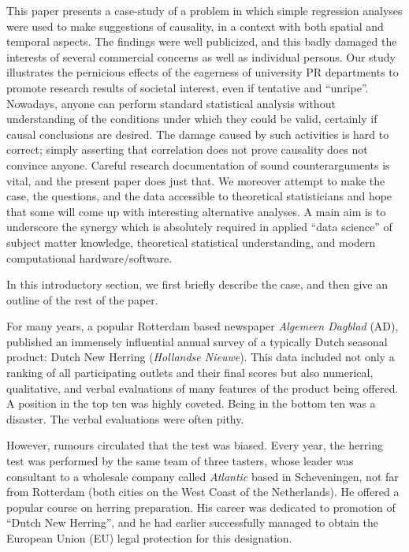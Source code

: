 \documentclass[alpha-refs]{wiley-article}
\newcommand{\fn}[1]{\textcolor{purple}{#1}}
\begin{document}
This paper presents a case-study of a problem in which simple regression analyses were used to make suggestions of causality, in a context with both spatial and temporal aspects. The findings were well publicized, and this badly damaged the interests of several commercial concerns as well as individual persons. Our study illustrates the pernicious effects of the eagerness of university PR departments to promote research results of societal interest, even if tentative and ``unripe''. Nowadays, anyone can perform standard statistical analysis without understanding of the conditions under which they could be valid, certainly if causal conclusions are desired. The damage caused by such activities is hard to correct; simply asserting that correlation does not prove causality does not convince anyone. Careful research documentation of sound counterarguments is vital, and the present paper does just that. We moreover attempt to make the case, the questions, and the data accessible to theoretical statisticians and hope that some will come up with interesting alternative analyses.  A main aim is to underscore the synergy which is absolutely required in applied ``data science'' of subject matter knowledge, theoretical statistical understanding, and modern computational hardware/software. %

In this introductory section, we first briefly describe the case, and then give an outline of the rest of the paper.

For many years, a popular Rotterdam based newspaper \emph{Algemeen Dagblad} (AD), published an immensely influential annual survey of a typically Dutch seasonal product: Dutch New Herring (\emph{Hollandse Nieuwe}). This data included not only a ranking of all participating outlets and their final scores but also numerical, qualitative, and verbal evaluations of many features of the product being offered. A position in the top ten was highly coveted. Being in the bottom ten was a disaster. The verbal evaluations were often pithy.

However, rumours circulated that the test was biased.  Every year, the herring test was performed by the same team of three tasters, whose leader was consultant to a wholesale company called \emph{Atlantic} based in Scheveningen, not far from Rotterdam (both cities on the West Coast of the Netherlands). He offered a popular course on herring preparation.  His career was  dedicated to promotion of ``Dutch New Herring'', and he had earlier successfully managed to obtain the European Union (EU) legal protection for this designation. 
\end{document}
